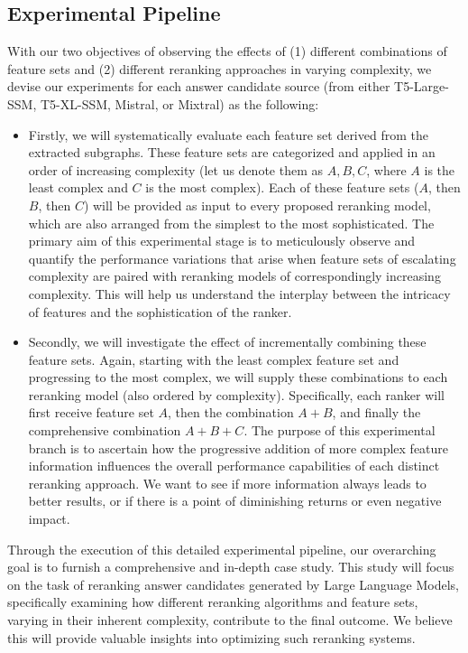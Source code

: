 \subsection{Experimental Pipeline} \label{sec:controllable_fusion:experimental_pipeline}

With our two objectives of observing the effects of (1) different combinations of feature sets and (2) different reranking approaches in varying complexity, we devise our experiments for each answer candidate source (from either T5-Large-SSM, T5-XL-SSM, Mistral, or Mixtral)  as the following: 
\begin{itemize}
    \item Firstly, we will systematically evaluate each feature set derived from the extracted subgraphs. These feature sets are categorized and applied in an order of increasing complexity (let us denote them as $A, B, C$, where $A$ is the least complex and $C$ is the most complex). Each of these feature sets ($A$, then $B$, then $C$) will be provided as input to every proposed reranking model, which are also arranged from the simplest to the most sophisticated. The primary aim of this experimental stage is to meticulously observe and quantify the performance variations that arise when feature sets of escalating complexity are paired with reranking models of correspondingly increasing complexity. This will help us understand the interplay between the intricacy of features and the sophistication of the ranker.
    \item Secondly, we will investigate the effect of incrementally combining these feature sets. Again, starting with the least complex feature set and progressing to the most complex, we will supply these combinations to each reranking model (also ordered by complexity). Specifically, each ranker will first receive feature set $A$, then the combination $A+B$, and finally the comprehensive combination $A+B+C$. The purpose of this experimental branch is to ascertain how the progressive addition of more complex feature information influences the overall performance capabilities of each distinct reranking approach. We want to see if more information always leads to better results, or if there is a point of diminishing returns or even negative impact.
\end{itemize}
Through the execution of this detailed experimental pipeline, our overarching goal is to furnish a comprehensive and in-depth case study. This study will focus on the task of reranking answer candidates generated by Large Language Models, specifically examining how different reranking algorithms and feature sets, varying in their inherent complexity, contribute to the final outcome. We believe this will provide valuable insights into optimizing such reranking systems.

